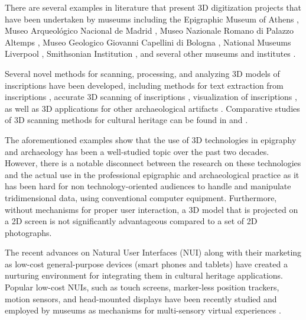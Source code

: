 \documentclass[amsthm,ebook]{saparticle}
\begin{document}
There are several examples in literature that present 3D digitization projects that have been undertaken by museums
including the Epigraphic Museum of Athens \citep{sullivan_analytical_2011, papadaki_accurate_2015}, Museo Arqueológico Nacional de
Madrid \citep{ramirez-sanchez_epigrafidigital:_2014}, Museo Nazionale Romano di Palazzo Altemps \citep{barmpoutis_interactive_2015}, Museo
Geologico Giovanni Capellini di Bologna \citep{abate_valorizzazione_2014}, National Museums Liverpool \citep{cooper_chiswick_2007},
Smithsonian Institution \citep{wachowiak_3d_2009}, and several other museums and institutes \citep{barsanti_3d_2013, landon_petroglyph_2006, levoy_digital_2000}.

Several novel methods for scanning, processing, and analyzing 3D models of inscriptions have been developed, including
methods for text extraction from inscriptions \citep{aswatha_method_2014, sullivan_analytical_2011}, accurate 3D scanning of
inscriptions \citep{papadaki_accurate_2015}, visualization of inscriptions \citep{bozia_open-access_2014}, as well as 3D applications for
other archaeological artifacts \citep{babeu__2011, pollefeys_image-based_2001, malzbender_polynomial_2001, esteban_silhouette_2004}.
Comparative studies of 3D scanning methods for cultural heritage can be found in \citep{pavlidis_methods_2007} and \citep{bohler_3d_2004}. 

The aforementioned examples show that the use of 3D technologies in epigraphy and archaeology has been a
well-studied topic over the past two decades. However, there is a notable disconnect between the research on these
technologies and the actual use in the professional epigraphic and archaeological practice as it has been hard for
non technology-oriented audiences to handle and manipulate tridimensional data, using conventional computer equipment.
Furthermore, without mechanisms for proper user interaction, a 3D model that is projected on a 2D screen is not
significantly advantageous compared to a set of 2D photographs. 

The recent advances on Natural User Interfaces (NUI) along with their marketing as low-cost general-purpose devices
(smart phones and tablets) have created a nurturing environment for integrating them in cultural heritage applications.
Popular low-cost NUIs, such as touch screens, marker-less position trackers, motion sensors, and head-mounted displays
have been recently studied and employed by museums as mechanisms for multi-sensory virtual experiences \citep{ujitoko_application_2015, soile_accurate_2013, ikei_experience_2015}.
\end{document}
